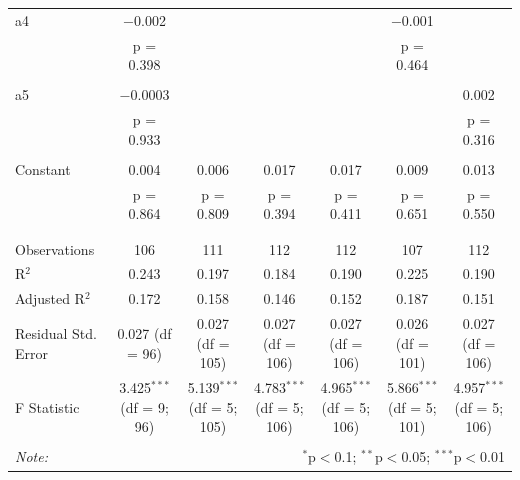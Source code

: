 \begin{table}[!htbp]
\begin{tabular}{@{\extracolsep{5pt}}lcccccc}
 a4 & $-$0.002 &  &  &  & $-$0.001 &  \\ 
  & p = 0.398 &  &  &  & p = 0.464 &  \\ 
  & & & & & & \\ 
 a5 & $-$0.0003 &  &  &  &  & 0.002 \\ 
  & p = 0.933 &  &  &  &  & p = 0.316 \\ 
  & & & & & & \\ 
 Constant & 0.004 & 0.006 & 0.017 & 0.017 & 0.009 & 0.013 \\ 
  & p = 0.864 & p = 0.809 & p = 0.394 & p = 0.411 & p = 0.651 & p = 0.550 \\ 
  & & & & & & \\ 
\hline \\[-1.8ex] 
Observations & 106 & 111 & 112 & 112 & 107 & 112 \\ 
R$^{2}$ & 0.243 & 0.197 & 0.184 & 0.190 & 0.225 & 0.190 \\ 
Adjusted R$^{2}$ & 0.172 & 0.158 & 0.146 & 0.152 & 0.187 & 0.151 \\ 
Residual Std. Error & 0.027 (df = 96) & 0.027 (df = 105) & 0.027 (df = 106) & 0.027 (df = 106) & 0.026 (df = 101) & 0.027 (df = 106) \\ 
F Statistic & 3.425$^{***}$ (df = 9; 96) & 5.139$^{***}$ (df = 5; 105) & 4.783$^{***}$ (df = 5; 106) & 4.965$^{***}$ (df = 5; 106) & 5.866$^{***}$ (df = 5; 101) & 4.957$^{***}$ (df = 5; 106) \\ 
\hline 
\hline \\[-1.8ex] 
\textit{Note:}  & \multicolumn{6}{r}{$^{*}$p$<$0.1; $^{**}$p$<$0.05; $^{***}$p$<$0.01} \\ 
\end{tabular} 
\end{table}



